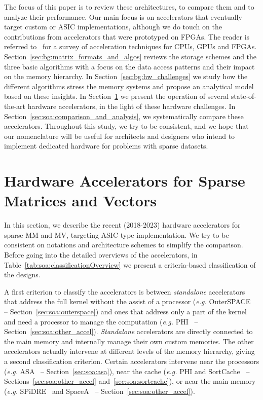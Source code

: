 The focus of this paper is to review these architectures, to compare them and to analyze their performance. Our main focus is on accelerators that eventually target custom or ASIC implementations, although we do touch on the contributions from accelerators that were prototyped on FPGAs. The reader is referred to~\cite{MOHAMMED_2022_SPARSE} for a survey of acceleration techniques for CPUs, GPUs and FPGAs. Section~\ref{sec:bg:matrix_formats_and_algos} reviews the storage schemes and the three basic algorithms with a focus on the data access patterns and their impact on the memory hierarchy. In Section~\ref{sec:bg:hw_challenges} we study how the different algorithms stress the memory systems and propose an analytical model based on these insights. In Section~\ref{sec:soa:hw_accelerators} we present the operation of several state-of-the-art hardware accelerators, in the light of these hardware challenges. In Section~\ref{sec:soa:comparison_and_analysis}, we systematically compare these accelerators. Throughout this study, we try to be consistent, and we hope that our nomenclature will be useful for architects and designers who intend to implement dedicated hardware for problems with sparse datasets.


\section{Hardware Accelerators for Sparse Matrices and Vectors}
\label{sec:soa:hw_accelerators}

In this section, we describe the recent (2018-2023) hardware accelerators for sparse MM and MV, targeting ASIC-type implementation. We try to be consistent on notations and architecture schemes to simplify the comparison. Before going into the detailed overviews of the accelerators, in Table~\ref{tab:soa:classificationOverview} we present a criteria-based classification of the designs.

A first criterion to classify the accelerators is between \emph{standalone} accelerators that address the full kernel without the assist of a processor (\emph{e.g.} OuterSPACE~\cite{Pal2018_OuterSPACE} -- Section~\ref{sec:soa:outerspace}) and ones that  address only a part of the kernel and need a processor to manage the computation (\emph{e.g.} PHI~\cite{Mukkara2019_PHI} -- Section~\ref{sec:soa:other_accel}).
\emph{Standalone} accelerators are directly connected to the main memory and internally manage their own custom memories. The other accelerators actually intervene at different levels of the memory hierarchy, giving a second classification criterion. Certain accelerators intervene near the processors (\emph{e.g.} ASA~\cite{Zhang2022_ASA} -- Section~\ref{sec:soa:asa}), near the cache (\emph{e.g.} PHI and SortCache~\cite{Srikanth2021_SortCache} -- Sections~\ref{sec:soa:other_accel} and~\ref{sec:soa:sortcache}), or near the main memory (\emph{e.g.} SPiDRE~\cite{Barredo2019_SPiDRE} and SpaceA~\cite{Xie2021_SpaceA} -- Section~\ref{sec:soa:other_accel}).

